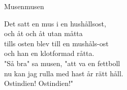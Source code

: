 \begin{song}{Musen}{musen}
\begin{vers}
Det satt en mus i en hushållsost,\\
och åt och åt utan måtta\\
tills osten blev till en mushåls-ost\\
och han en klotformad råtta.\\
"Så bra" sa musen, "att va en fettboll\\
nu kan jag rulla med hast år rätt håll.\\
Ostindien! Ostindien!"\\
\end{vers}
\end{song}
